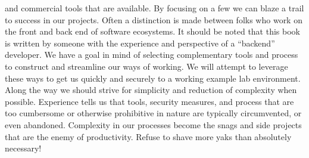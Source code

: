 and commercial tools that are available. By focusing on a few we can blaze a
trail to success in our projects.
\justify{}
Often a distinction is made between folks
who work on the front and back end of software ecosystems. It should be noted that this book is written by someone with the
experience and perspective of a ``backend'' developer.
\justify{}
We have a goal in mind of selecting complementary tools and process to construct
and streamline our ways of working. We will attempt to leverage these ways to
get us quickly and securely to a working example lab environment. Along the
way we should strive for simplicity and reduction of complexity when possible.
Experience tells us that tools, security measures, and process that are too cumbersome
or otherwise prohibitive in nature are typically circumvented, or even abandoned.
Complexity in our processes become the snags and side projects that are the
enemy of productivity.
\justify{}
Refuse to shave more yaks\cite{yak} than absolutely necessary!

